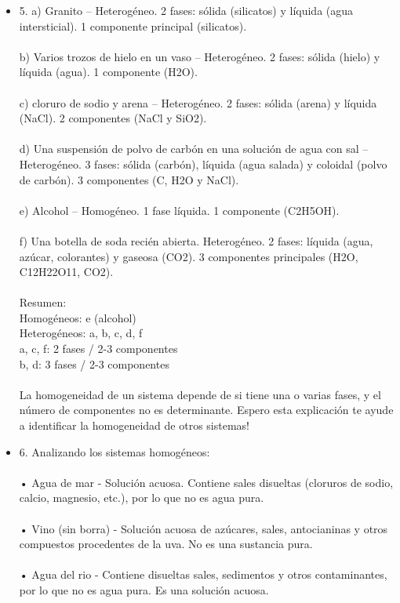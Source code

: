 \documentclass{article}
\begin{document}
\begin{itemize}
\item{5.}
a) Granito – Heterogéneo. 2 fases: sólida (silicatos) y líquida (agua intersticial). 1 componente principal (silicatos).\\
\\
b) Varios trozos de hielo en un vaso – Heterogéneo. 2 fases: sólida (hielo) y líquida (agua). 1 componente (H2O).\\
\\
c) cloruro de sodio y arena – Heterogéneo. 2 fases: sólida (arena) y líquida (NaCl). 2 componentes (NaCl y SiO2).\\
\\
d) Una suspensión de polvo de carbón en una solución de agua con sal – Heterogéneo. 3 fases: sólida (carbón), líquida (agua salada) y coloidal (polvo de carbón). 3 componentes (C, H2O y NaCl).\\
\\
e) Alcohol – Homogéneo. 1 fase líquida. 1 componente (C2H5OH).\\
\\
f) Una botella de soda recién abierta. Heterogéneo. 2 fases: líquida (agua, azúcar, colorantes) y gaseosa (CO2). 3 componentes principales (H2O, C12H22O11, CO2).\\
\\
Resumen:\\
Homogéneos: e (alcohol)\\
Heterogéneos: a, b, c, d, f\\
a, c, f: 2 fases / 2-3 componentes\\
b, d: 3 fases / 2-3 componentes\\
\\
La homogeneidad de un sistema depende de si tiene una o varias fases, y el número de componentes no es determinante. Espero esta explicación te ayude a identificar la homogeneidad de otros sistemas!\\
\item{6.}
Analizando los sistemas homogéneos:\\
\\
• Agua de mar - Solución acuosa. Contiene sales disueltas (cloruros de sodio, calcio, magnesio, etc.), por lo que no es agua pura.\\
\\
• Vino (sin borra) - Solución acuosa de azúcares, sales, antocianinas y otros compuestos procedentes de la uva. No es una sustancia pura.\\
\\
• Agua del rio - Contiene disueltas sales, sedimentos y otros contaminantes, por lo que no es agua pura. Es una solución acuosa.\\

\end{itemize}
\end{document}
